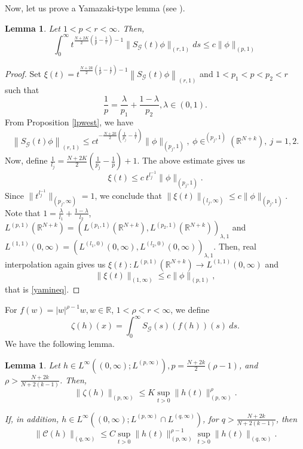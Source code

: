 \documentclass[12pt]{amsart}
\newtheorem{lemma}[theorem]{Lemma}
\newcommand{\R}{\mathbb{R}}
\begin{document}
Now, let us prove a Yamazaki-type lemma (see \cite{Yamazaki}).
\begin{lemma}\label{yam}
	Let $1<p<r<\infty$. Then,
	\begin{equation}\label{yamineq}
		\int_{0}^{\infty} t^{\frac{N+2 K}{2}\left(\frac{1}{p}-\frac{1}{r}\right)-1} \|S_\mathcal{G}(t) \phi\|_{(r, 1)} d s \leq c\|\phi\|_{(p, 1)}
	\end{equation}
\end{lemma}
\begin{proof}
	Set $\xi(t)=t^{\frac{N+2k}{2}\left(\frac{1}{p}-\frac{1}{r}\right)-1} \left\|S_{\mathcal{G}}(t) \phi\right\|_{(r, 1)}$ and $1<p_{1}<p<p_{2}<r$ such that	
	$$
	\frac{1}{p}=\frac{\lambda}{p_{1}}+\frac{1-\lambda}{p_{2}}, \lambda \in(0,1) .
	$$
	From Proposition \ref{lpwest}, we have	
	$$
	\left\|S_{\mathcal{G}}(t) \phi\right\|_{(r, 1)} \leq c t^{-\frac{N+2 k}{2}\left(\frac{1}{p_{j}}-\frac{1}{r}\right)} \|\phi\|_{(p_j,1)} ,\ \phi\in ^{(p_j,1)}(\R^{N+k}), \ j=1,2.
	$$
	Now, define $\frac{1}{l_j} = \frac{N+2K}{2} \left(\frac{1}{p_j}-\frac{1}{p}\right) + 1$. The above estimate gives us
	\begin{equation*}
		\xi(t) \leq c \ t^{l_j^{-1}} \|\phi\|_{(p_j,1)} .
	\end{equation*}
	Since $\|t^{l_j^{-1}}\|_{(p_j,\infty)}=1$, we conclude that $\|\xi(t)\|_{(l_j,\infty)} \leq c \|\phi\|_{(p_j,1)}$. Note that $1=\frac{\lambda}{l_{1}}+\frac{1-\lambda}{l_{2}}$, $L^{(p, 1)}(\R^{N+k})=\left(L^{\left(p_{1}, 1\right)}(\R^{N+k}), L^{\left(p_{2}, 1\right)}(\R^{N+k})\right)_{\lambda, 1}$ and $L^{(1,1)}(0, \infty)=\left(L^{\left(l_{1}, 0\right)}(0, \infty),L^{\left(l_{2}, 0\right)}(0, \infty)\right)_{\lambda, 1}$. Then, real interpolation again gives us $\xi(t): L^{(p, 1)}(\R^{N+k}) \to L^{(1,1)}(0, \infty)$ and 
	$$ \|\xi(t)\|_{(1,\infty)} \leq c \|\phi\|_{(p,1)} ,$$
	that is \eqref{yamineq}.
\end{proof}




For $f(w)=|w|^{\rho-1}w, w\in\R$, $1<\rho<r<\infty$, we define
$$
\zeta(h)(x)=\int_{0}^{\infty} S_\mathcal{G}(s)(f(h))(s) \ ds.
$$
We have the following lemma.
\begin{lemma}\label{nonl}
	Let $h \in L^{\infty}\left((0, \infty) ; L^{(p, \infty)}\right), p=\frac{N+2 k}{2}(\rho-1)$, and $\rho> \frac{N+2k}{N+2(k-1)}$. Then,
	\begin{equation}
		\|\zeta(h)\|_{(p, \infty)} \leq K \sup_{t>0}\|h(t)\|_{(p, \infty)}^{\rho}	.
	\end{equation}
	
	If, in addition, $h \in L^{\infty}\left((0, \infty) ; L^{(p, \infty)} \cap L^{(q, \infty)}\right)$, for $q>\frac{N+2k}{N+2(k-1)}$, then
	\begin{equation}\label{nonl2}
		\|\mathcal{C}(h)\|_{(q,\infty)} \leq C\sup_{t>0} \|h(t)\|^{\rho -1}_{(p,\infty)}\sup_{t>0} \|h(t)\|_{(q,\infty)} .
	\end{equation}
	
\end{lemma}
\end{document}
